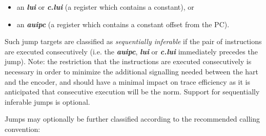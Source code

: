 \begin{itemize}
  \item an \textbf{\textit{lui}} or \textbf{\textit{c.lui}} (a register which contains a constant), or
  \item an \textbf{\textit{auipc}} (a register which contains a constant offset from the PC).
\end{itemize}

Such jump targets are classified as \textit{sequentially inferable} if the pair of instructions are executed consecutively 
(i.e. the \textbf{\textit{auipc}}, \textbf{\textit{lui}} or \textbf{\textit{c.lui}} immediately precedes the jump).  Note:
the restriction that the instructions are executed consecutively is necessary in order to minimize the additional signalling
needed between the hart and the encoder, and should have a minimal impact on trace efficiency as it is anticipated that
consecutive execution will be the norm. Support for sequentially inferable jumps is optional.

Jumps may optionally be further classified according to the recommended calling convention:

